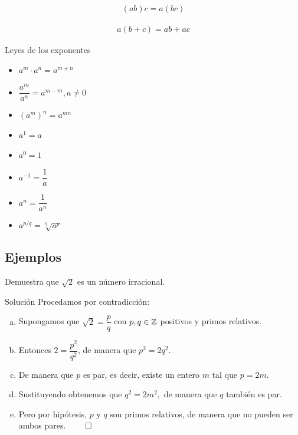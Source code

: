 
{}
	\begin{axiom}
		\label{axiom--4}
		\begin{align}
		(ab)c = a(bc)
		\end{align}
	\end{axiom}

{}
	\begin{axiom}
		\label{axiom--5}
		\begin{align}
		a(b+c)=ab+ac
		\end{align}
	\end{axiom}

{Leyes de los exponentes}
	\begin{itemize}
		\item $a^{m}\cdot a^{n} = a^{m+n}$ 
		\item $\dfrac{a^{m}}{a^{n}} = a^{m-m}, a\neq 0$ 
		\item $\left(a^{m}\right)^{n} = a^{mn}$
	\end{itemize}


	\begin{itemize}
		\item $ a^{1}= a $ 
		\item $ a^{0}= 1 $ 
		\item $ a^{-1}= \dfrac{1}{a} $ 
		\item $ a^{n}= \dfrac{1}{a^{n}}  $
		\item $ a^{p/q}= \sqrt[q]{a^{p}} $
	\end{itemize}

\subsection{Ejemplos}

{}
 \begin{problema}
 	Demuestra que $\sqrt{2}$ es un número irracional.
 \end{problema}

{Solución}
	Procedamos por contradicción: 
	\begin{enumerate}[(a)]
		\item Supongamos que $\sqrt{2}=\dfrac{p}{q}$ con $ p,q \in \mathbb{Z}$ positivos y primos relativos.  
		\item Entonces $ 2= \dfrac{p^{2}}{q^{2}}$, de manera que $p^{2}=2q^{2}$.
		\item De manera que $p$ es par, es decir, existe un entero $m$ tal que $p=2m$. 
		\item Sustituyendo obtenemos que $q^{2}=2m^{2},$ de manera que $q$ también es par. 
		\item Pero por hipótesis, $p$ y $q$ son primos relativos, de manera que no pueden ser ambos pares. $\qed$
	\end{enumerate}


